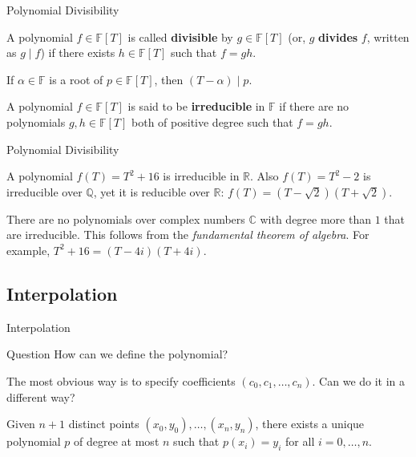 \documentclass{zkdl-presentation-template}
\begin{document}
    \begin{frame}{Polynomial Divisibility}
      \begin{definition}
        A polynomial $f \in \mathbb{F}[T]$ is called \textbf{divisible} by $g \in \mathbb{F}[T]$ (or, $g$ \textbf{divides} $f$, written as $g \mid f$) if there exists $h \in \mathbb{F}[T]$ such that $f=gh$.
      \end{definition}
      \pause

      \begin{theorem}
        If $\alpha \in \mathbb{F}$ is a root of $p \in \mathbb{F}[T]$, then $(T-\alpha) \mid p$.
      \end{theorem}
      \pause

      \begin{definition}
        A polynomial $f \in \mathbb{F}[T]$ is said to be \textbf{irreducible} in $\mathbb{F}$ if there are no polynomials $g,h \in \mathbb{F}[T]$ both of positive degree such that $f = gh$.
      \end{definition}
    \end{frame}

    \begin{frame}{Polynomial Divisibility}
      \begin{example}
        A polynomial $f(T) = T^2+16$ is irreducible in $\mathbb{R}$. Also $f(T) = T^2-2$ is irreducible over $\mathbb{Q}$, yet it is reducible over $\mathbb{R}$: $f(T) = (T-\sqrt{2})(T+\sqrt{2})$.
      \end{example}
      \pause

      \begin{example}
        There are no polynomials over complex numbers $\mathbb{C}$ with degree more than $1$ that are irreducible. This follows from the \textit{fundamental theorem of algebra}. For example, $T^2+16 = (T-4i)(T+4i)$.
      \end{example}
    \end{frame}

    \subsection{Interpolation}
    \begin{frame}{Interpolation}
      \begin{questionblock}{Question}
        How can we define the polynomial?
      \end{questionblock}
      \pause

      The most obvious way is to specify coefficients $(c_0,c_1,\dots,c_n)$. Can we do it in a different way?
      \pause

      \begin{theorem}
        Given $n+1$ distinct points $(x_0,y_0),\dots,(x_n,y_n)$, there exists a unique polynomial $p$ of degree at most $n$ such that $p(x_i) = y_i$ for all $i=0,\dots,n$.
      \end{theorem}
    \end{frame}
\end{document}
